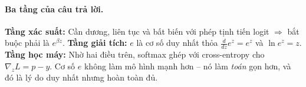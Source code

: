 \paragraph{Ba tầng của câu trả lời.} \textbf{Tầng xác suất:} Cần dương, liên tục và bất biến với phép tịnh tiến logit $\Rightarrow$ bắt buộc phải là $e^{\beta z}$. \textbf{Tầng giải tích:} $e$ là cơ số duy nhất thỏa $\frac{d}{dz}e^z = e^z$ và $\ln e^z = z$. \textbf{Tầng học máy:} Nhờ hai điều trên, softmax ghép với cross-entropy cho $\nabla_z L = p - y$. Cơ số $e$ không làm mô hình mạnh hơn -- nó làm \emph{toán} gọn hơn, và đó là lý do duy nhất nhưng hoàn toàn đủ.
